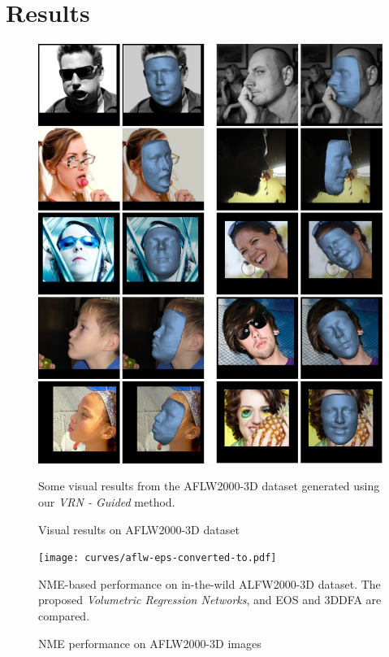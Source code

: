 

\section{Results} \label{S:Results}

\begin{figure}
\centering
\includegraphics[width=\linewidth]{img/aflw2000res.pdf}
\caption{Visual results on AFLW2000-3D dataset}{Some visual results
  from the AFLW2000-3D dataset generated using our \textit{VRN -
    Guided} method.}
\label{fig:aflw2000res}
\vspace{-4mm}
\end{figure}

\begin{figure}
  \centering
  \texttt{[image: curves/aflw-eps-converted-to.pdf]}
  \caption{NME performance on AFLW2000-3D images}{NME-based
    performance on in-the-wild ALFW2000-3D dataset. The proposed
    \textit{Volumetric Regression Networks}, and EOS and 3DDFA are
    compared.}
  \label{roc:aflw2000}
\end{figure}

